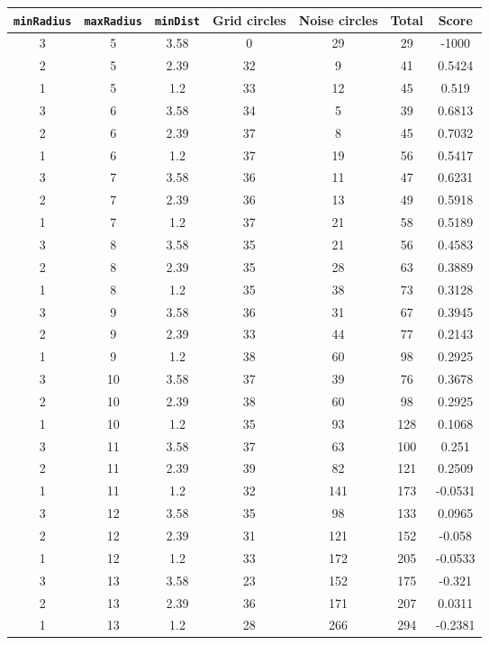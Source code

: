 \documentclass[letterpaper, 12pt]{article}
\begin{document}
\begin{longtable}{|c|c|c|c|c|c|c|}
\hline
\textbf{\texttt{minRadius}} & \textbf{\texttt{maxRadius}} & \textbf{\texttt{minDist}} & \textbf{Grid circles} & \textbf{Noise circles} & \textbf{Total} & \textbf{Score} \\
\hline
3 & 5 & 3.58 & 0 & 29 & 29 & -1000 \\
\hline
2 & 5 & 2.39 & 32 & 9 & 41 & 0.5424 \\
\hline
1 & 5 & 1.2 & 33 & 12 & 45 & 0.519 \\
\hline
3 & 6 & 3.58 & 34 & 5 & 39 & 0.6813 \\
\hline
2 & 6 & 2.39 & 37 & 8 & 45 & 0.7032 \\
\hline
1 & 6 & 1.2 & 37 & 19 & 56 & 0.5417 \\
\hline
3 & 7 & 3.58 & 36 & 11 & 47 & 0.6231 \\
\hline
2 & 7 & 2.39 & 36 & 13 & 49 & 0.5918 \\
\hline
1 & 7 & 1.2 & 37 & 21 & 58 & 0.5189 \\
\hline
3 & 8 & 3.58 & 35 & 21 & 56 & 0.4583 \\
\hline
2 & 8 & 2.39 & 35 & 28 & 63 & 0.3889 \\
\hline
1 & 8 & 1.2 & 35 & 38 & 73 & 0.3128 \\
\hline
3 & 9 & 3.58 & 36 & 31 & 67 & 0.3945 \\
\hline
2 & 9 & 2.39 & 33 & 44 & 77 & 0.2143 \\
\hline
1 & 9 & 1.2 & 38 & 60 & 98 & 0.2925 \\
\hline
3 & 10 & 3.58 & 37 & 39 & 76 & 0.3678 \\
\hline
2 & 10 & 2.39 & 38 & 60 & 98 & 0.2925 \\
\hline
1 & 10 & 1.2 & 35 & 93 & 128 & 0.1068 \\
\hline
3 & 11 & 3.58 & 37 & 63 & 100 & 0.251 \\
\hline
2 & 11 & 2.39 & 39 & 82 & 121 & 0.2509 \\
\hline
1 & 11 & 1.2 & 32 & 141 & 173 & -0.0531 \\
\hline
3 & 12 & 3.58 & 35 & 98 & 133 & 0.0965 \\
\hline
2 & 12 & 2.39 & 31 & 121 & 152 & -0.058 \\
\hline
1 & 12 & 1.2 & 33 & 172 & 205 & -0.0533 \\
\hline
3 & 13 & 3.58 & 23 & 152 & 175 & -0.321 \\
\hline
2 & 13 & 2.39 & 36 & 171 & 207 & 0.0311 \\
\hline
1 & 13 & 1.2 & 28 & 266 & 294 & -0.2381 \\

\end{longtable}
\end{document}
